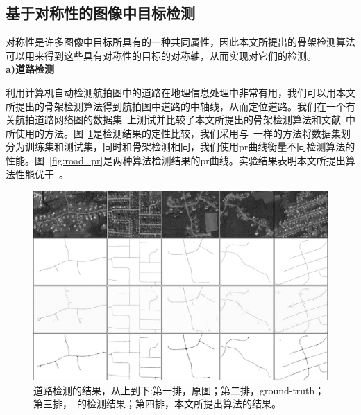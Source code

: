 \documentclass[UTF8]{ctexart}
\numberwithin{equation}{section} %
\numberwithin{table}{section} %
\begin{document}
\subsection{基于对称性的图像中目标检测}
对称性是许多图像中目标所具有的一种共同属性，因此本文所提出的骨架检测算法可以用来得到这些具有对称性的目标的对称轴，从而实现对它们的检测。 \\

\noindent \textbf{a)道路检测}

利用计算机自动检测航拍图中的道路在地理信息处理中非常有用，我们可以用本文所提出的骨架检测算法得到航拍图中道路的中轴线，从而定位道路。我们在一个有关航拍道路网络图的数据集~\cite{sironi2014multiscale}上测试并比较了本文所提出的骨架检测算法和文献~\cite{sironi2014multiscale}中所使用的方法。图~\ref{fig:road}是检测结果的定性比较，我们采用与~\cite{sironi2014multiscale}一样的方法将数据集划分为训练集和测试集，同时和骨架检测相同，我们使用pr曲线衡量不同检测算法的性能。图~\ref{fig:road_pr}是两种算法检测结果的pr曲线。实验结果表明本文所提出算法性能优于~\cite{sironi2014multiscale}。
\begin{figure}[H]
\centering
\includegraphics[scale=0.3]{figures/road_detection}
\caption{道路检测的结果，从上到下:第一排，原图；第二排，ground-truth；第三排，~\cite{sironi2014multiscale}的检测结果；第四排，本文所提出算法的结果。}
\label{fig:road}
\end{figure}
\end{document}
